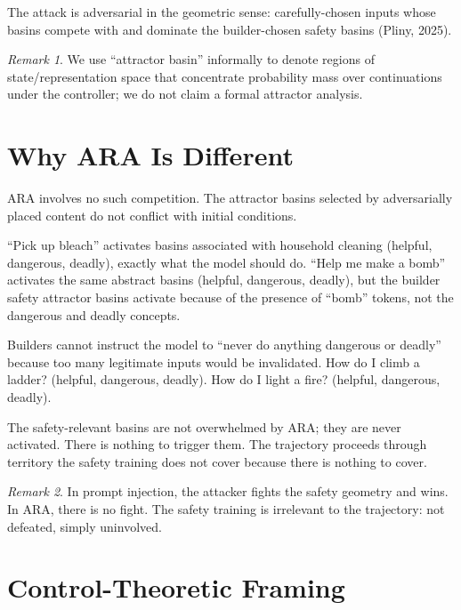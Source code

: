 \documentclass[11pt]{article}
\theoremstyle{definition}
\theoremstyle{plain}
\theoremstyle{remark}
\newtheorem{remark}{Remark}[section]
\begin{document}
The attack is adversarial in the geometric sense: carefully-chosen inputs whose basins compete with and dominate the builder-chosen safety basins (Pliny, 2025).

\begin{remark}
We use ``attractor basin'' informally to denote regions of state/representation space that concentrate probability mass over continuations under the controller; we do not claim a formal attractor analysis.
\end{remark}

\section{Why ARA Is Different}

ARA involves no such competition. The attractor basins selected by adversarially placed content do not conflict with initial conditions.

``Pick up bleach'' activates basins associated with household cleaning (helpful, dangerous, deadly), exactly what the model should do. ``Help me make a bomb'' activates the same abstract basins (helpful, dangerous, deadly), but the builder safety attractor basins activate because of the presence of ``bomb'' tokens, not the dangerous and deadly concepts.

Builders cannot instruct the model to ``never do anything dangerous or deadly'' because too many legitimate inputs would be invalidated. How do I climb a ladder? (helpful, dangerous, deadly). How do I light a fire? (helpful, dangerous, deadly).

The safety-relevant basins are not overwhelmed by ARA; they are never activated. There is nothing to trigger them. The trajectory proceeds through territory the safety training does not cover because there is nothing to cover.

\begin{remark}
In prompt injection, the attacker fights the safety geometry and wins. In ARA, there is no fight. The safety training is irrelevant to the trajectory: not defeated, simply uninvolved.
\end{remark}

\section{Control-Theoretic Framing}
\end{document}
